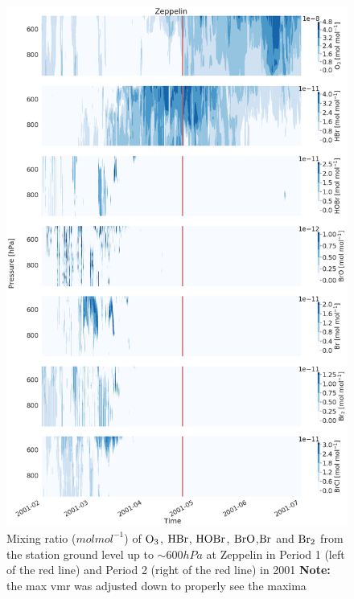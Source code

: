 \begin{figure}[h]
    \centering
    \includegraphics[width=0.9\linewidth]{Chapter6_Results/images/Vert_StationComp_2001/vert_all_species_ZEP.png}
    \caption{Mixing ratio ($mol mol^{-1}$) of $\mathrm{O_3}$, $\mathrm{HBr}$, $\mathrm{HOBr}$, $\mathrm{BrO}$,$\mathrm{Br}$ and $\mathrm{Br_2}$ from the station ground level up to $\sim 600 hPa$ at Zeppelin in Period 1 (left of the red line) and Period 2 (right of the red line) in 2001 \textbf{Note:} the max  vmr was adjusted down to properly see the maxima}
    \label{fig:vert_ZEP}
\end{figure}
